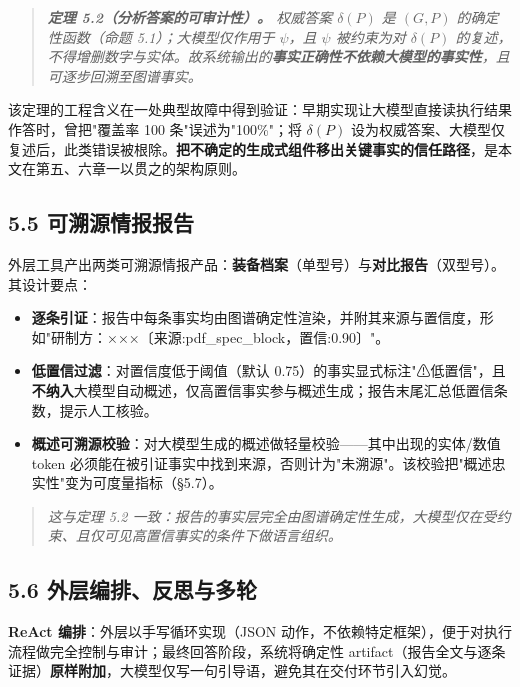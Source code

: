 \documentclass[12pt,a4paper]{ctexart}
\begin{document}
\begin{quote}\itshape \textbf{定理 5.2（分析答案的可审计性）。} 权威答案 $\delta(P)$ 是 $(G,P)$ 的确定性函数（命题 5.1）；大模型仅作用于 $\psi$，且 $\psi$ 被约束为对 $\delta(P)$ 的复述，不得增删数字与实体。故系统输出的\textbf{事实正确性不依赖大模型的事实性}，且可逐步回溯至图谱事实。\end{quote}

该定理的工程含义在一处典型故障中得到验证：早期实现让大模型直接读执行结果作答时，曾把"覆盖率 100 条"误述为"100\%"；将 $\delta(P)$ 设为权威答案、大模型仅复述后，此类错误被根除。\textbf{把不确定的生成式组件移出关键事实的信任路径}，是本文在第五、六章一以贯之的架构原则。

\subsection*{5.5 可溯源情报报告}

外层工具产出两类可溯源情报产品：\textbf{装备档案}（单型号）与\textbf{对比报告}（双型号）。其设计要点：

\begin{itemize}[leftmargin=2em]
\item \textbf{逐条引证}：报告中每条事实均由图谱确定性渲染，并附其来源与置信度，形如"研制方：×××〔来源:pdf\_spec\_block，置信:0.90〕"。
\item \textbf{低置信过滤}：对置信度低于阈值（默认 0.75）的事实显式标注"⚠低置信"，且\textbf{不纳入}大模型自动概述，仅高置信事实参与概述生成；报告末尾汇总低置信条数，提示人工核验。
\item \textbf{概述可溯源校验}：对大模型生成的概述做轻量校验——其中出现的实体/数值 token 必须能在被引证事实中找到来源，否则计为"未溯源"。该校验把"概述忠实性"变为可度量指标（§5.7）。
\end{itemize}

\begin{quote}\itshape 这与定理 5.2 一致：报告的事实层完全由图谱确定性生成，大模型仅在受约束、且仅可见高置信事实的条件下做语言组织。\end{quote}

\subsection*{5.6 外层编排、反思与多轮}

\textbf{ReAct 编排}：外层以手写循环实现（JSON 动作，不依赖特定框架），便于对执行流程做完全控制与审计；最终回答阶段，系统将确定性 artifact（报告全文与逐条证据）\textbf{原样附加}，大模型仅写一句引导语，避免其在交付环节引入幻觉。
\end{document}
